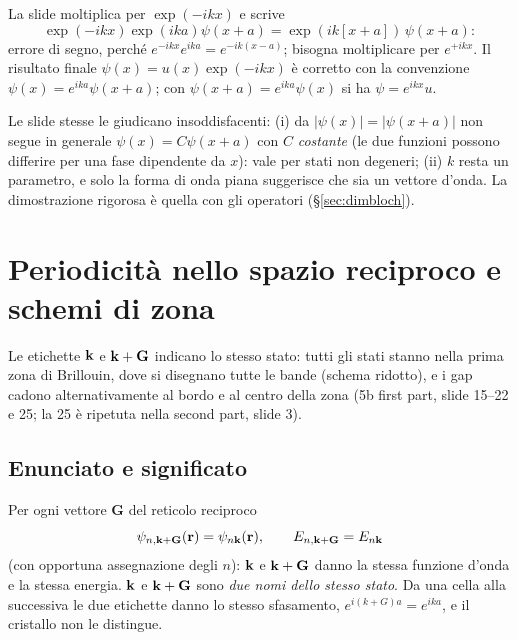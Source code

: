 \documentclass[11pt,a4paper]{article}
\begin{document}
\begin{osservazione}
La slide moltiplica per $\exp(-ikx)$ e scrive
\[
\exp(-ikx)\exp(ika)\psi(x+a)=\exp(ik[x+a])\,\psi(x+a):
\]
errore di segno, perché $e^{-ikx}e^{ika}=e^{-ik(x-a)}$; bisogna moltiplicare per $e^{+ikx}$. Il risultato finale $\psi(x)=u(x)\exp(-ikx)$ è corretto con la convenzione
$\psi(x)=e^{ika}\psi(x+a)$; con $\psi(x+a)=e^{ika}\psi(x)$ si ha $\psi=e^{ikx}u$.
\end{osservazione}

\begin{osservazione}
Le slide stesse le giudicano insoddisfacenti: (i) da $|\psi(x)|=|\psi(x+a)|$ non segue in generale $\psi(x)=C\psi(x+a)$ con $C$ \emph{costante} (le due funzioni
possono differire per una fase dipendente da $x$): vale per stati non degeneri; (ii) $k$ resta un parametro, e solo la forma di onda piana suggerisce che sia un
vettore d'onda. La dimostrazione rigorosa è quella con gli operatori (§\ref{sec:dimbloch}).
\end{osservazione}

\section{Periodicità nello spazio reciproco e schemi di zona}\label{sec:zone}
Le etichette $\mathbf k$ e $\mathbf k+\mathbf G$ indicano lo stesso stato: tutti gli stati stanno nella prima zona di Brillouin, dove si disegnano tutte le bande
(schema ridotto), e i gap cadono alternativamente al bordo e al centro della zona (5b first part, slide 15--22 e 25; la 25 è ripetuta nella second
part, slide 3).

\subsection{Enunciato e significato}
\begin{teorema}\label{teo:periodicita}
Per ogni vettore $\mathbf G$ del reticolo reciproco
\[
\psi_{n,\mathbf k+\mathbf G}(\mathbf r)=\psi_{n\mathbf k}(\mathbf r),\qquad E_{n,\mathbf k+\mathbf G}=E_{n\mathbf k}
\]
(con opportuna assegnazione degli $n$): $\mathbf k$ e $\mathbf k+\mathbf G$ danno la stessa funzione d'onda e la stessa energia.
\tcblower
$\mathbf k$ e $\mathbf k+\mathbf G$ sono \emph{due nomi dello stesso stato}. Da una cella alla successiva le due etichette danno lo stesso sfasamento,
$e^{i(k+G)a}=e^{ika}$, e il cristallo non le distingue.
\end{teorema}
\end{document}
